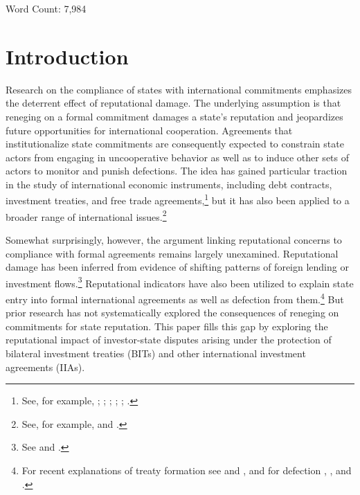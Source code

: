 \documentclass[12pt,onesided]{amsart}
\begin{document}
\begin{center}
Word Count: 7,984
\end{center}

\newpage

\setcounter{page}{1}
\doublespacing

\section*{Introduction}

Research on the compliance of states with international commitments emphasizes the deterrent effect of reputational damage. The underlying assumption is that reneging on a formal commitment damages a state's reputation and jeopardizes future opportunities for international cooperation. Agreements that institutionalize state commitments are consequently expected to constrain state actors from engaging in uncooperative behavior as well as to induce other sets of actors to monitor and punish defections. The idea has gained particular traction in the study of international economic instruments, including debt contracts, investment treaties, and free trade agreements,\footnote{See, for example, \citet{simmons:2000}; \citet{tomz:2007}; \citet{buthe:milner:2014}; \citet{buthe:milner:2008}; \citet{allee:peinhardt:2011}; \citet{elkins:etal:2006}.} but it has also been applied to a broader range of international issues.\footnote{See, for example, \citet{fearon:1997} and \citet{simmons:danner:2010}.}

Somewhat surprisingly, however, the argument linking reputational concerns to compliance with formal agreements remains largely unexamined. Reputational damage has been inferred from evidence of shifting patterns of foreign lending or investment flows.\footnote{See \citet{tomz:2007} and \citet{allee:peinhardt:2011}.} Reputational indicators have also been utilized to explain state entry into formal international agreements as well as defection from them.\footnote{For recent explanations of treaty formation see \citet{elkins:etal:2006} and \citet{simmons:danner:2010}, and for defection \citet{allee:peinhardt:2011}, \citet{freeman:2013}, and \citet{poulsen2013claim}.}  But prior research has not systematically explored the consequences of reneging on commitments for state reputation. This paper fills this gap by exploring the reputational impact of investor-state disputes arising under the protection of bilateral investment treaties (BITs) and other international investment agreements (IIAs).
\end{document}
